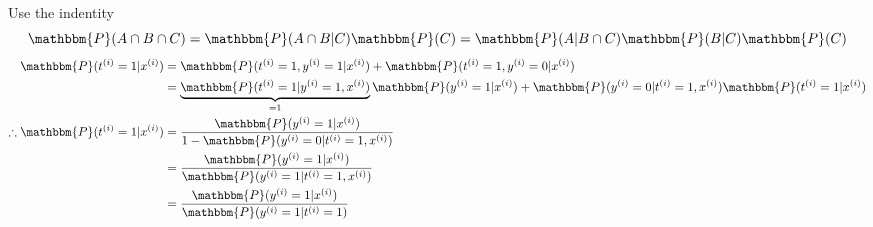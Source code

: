 \begin{answer}
Use the indentity 
$$\mathbbm{P}(A \cap B \cap C) = \mathbbm{P}(A \cap B | C) \mathbbm{P}(C) = \mathbbm{P}(A |B \cap C) \mathbbm{P}(B | C) \mathbbm{P}(C)$$
$$
\begin{aligned}
\mathbbm{P}(t^{(i)}=1|x^{(i)}) &= \mathbbm{P}(t^{(i)}=1,y^{(i)}=1|x^{(i)}) + \mathbbm{P}(t^{(i)}=1,y^{(i)}=0|x^{(i)}) \\
&=\underbrace{\mathbbm{P}(t^{(i)}=1|y^{(i)}=1,x^{(i)})}_{=1} \mathbbm{P}(y^{(i)}=1|x^{(i)}) + \mathbbm{P}(y^{(i)}=0|t^{(i)}=1,x^{(i)})\mathbbm{P}(t^{(i)}=1|x^{(i)}) \\
\therefore \mathbbm{P}(t^{(i)}=1|x^{(i)}) &=\frac{\mathbbm{P}(y^{(i)}=1|x^{(i)})}{1 - \mathbbm{P}(y^{(i)}=0|t^{(i)}=1,x^{(i)})}\\
&= \frac{\mathbbm{P}(y^{(i)}=1|x^{(i)})}{\mathbbm{P}(y^{(i)}=1|t^{(i)}=1,x^{(i)})} \\
&= \frac{\mathbbm{P}(y^{(i)}=1|x^{(i)})}{\mathbbm{P}(y^{(i)}=1|t^{(i)}=1)}
\end{aligned}
$$


\end{answer}
